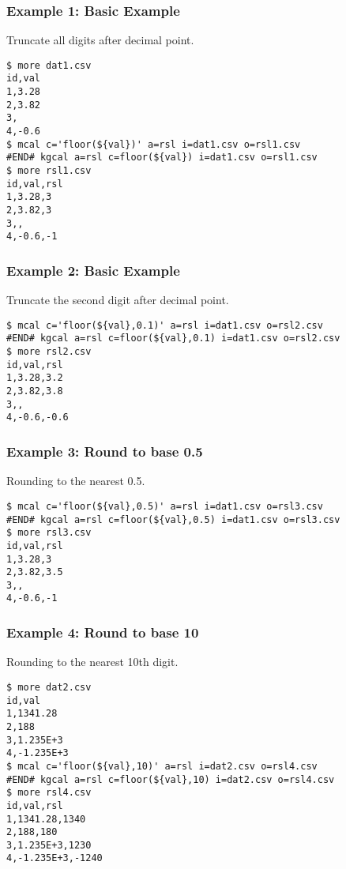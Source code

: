 \subsubsection*{Example 1: Basic Example}

Truncate all digits after decimal point.


\begin{Verbatim}[baselinestretch=0.7,frame=single]
$ more dat1.csv
id,val
1,3.28
2,3.82
3,
4,-0.6
$ mcal c='floor(${val})' a=rsl i=dat1.csv o=rsl1.csv
#END# kgcal a=rsl c=floor(${val}) i=dat1.csv o=rsl1.csv
$ more rsl1.csv
id,val,rsl
1,3.28,3
2,3.82,3
3,,
4,-0.6,-1
\end{Verbatim}
\subsubsection*{Example 2: Basic Example}

Truncate the second digit after decimal point.


\begin{Verbatim}[baselinestretch=0.7,frame=single]
$ mcal c='floor(${val},0.1)' a=rsl i=dat1.csv o=rsl2.csv
#END# kgcal a=rsl c=floor(${val},0.1) i=dat1.csv o=rsl2.csv
$ more rsl2.csv
id,val,rsl
1,3.28,3.2
2,3.82,3.8
3,,
4,-0.6,-0.6
\end{Verbatim}
\subsubsection*{Example 3: Round to base 0.5}

Rounding to the nearest 0.5.


\begin{Verbatim}[baselinestretch=0.7,frame=single]
$ mcal c='floor(${val},0.5)' a=rsl i=dat1.csv o=rsl3.csv
#END# kgcal a=rsl c=floor(${val},0.5) i=dat1.csv o=rsl3.csv
$ more rsl3.csv
id,val,rsl
1,3.28,3
2,3.82,3.5
3,,
4,-0.6,-1
\end{Verbatim}
\subsubsection*{Example 4: Round to base 10}

Rounding to the nearest 10th digit. 


\begin{Verbatim}[baselinestretch=0.7,frame=single]
$ more dat2.csv
id,val
1,1341.28
2,188
3,1.235E+3
4,-1.235E+3
$ mcal c='floor(${val},10)' a=rsl i=dat2.csv o=rsl4.csv
#END# kgcal a=rsl c=floor(${val},10) i=dat2.csv o=rsl4.csv
$ more rsl4.csv
id,val,rsl
1,1341.28,1340
2,188,180
3,1.235E+3,1230
4,-1.235E+3,-1240
\end{Verbatim}
